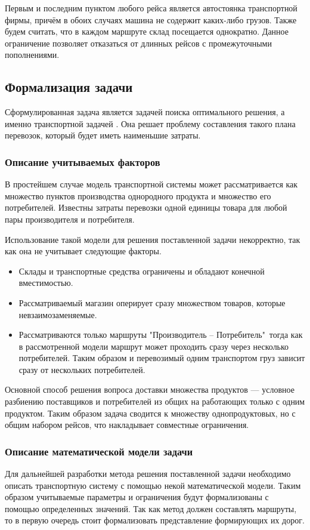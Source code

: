	Первым и последним пунктом любого рейса является автостоянка транспортной фирмы, причём в обоих случаях машина не содержит каких-либо грузов. Также будем считать, что в каждом маршруте склад посещается однократно. Данное ограничение позволяет отказаться от длинных рейсов с промежуточными пополнениями.

\subsection{Формализация задачи}
	Сформулированная задача является задачей поиска оптимального решения, а именно транспортной задачей \cite{trans:main}. Она решает проблему составления такого плана перевозок, который будет иметь наименьшие затраты. 
	
	\subsubsection{Описание учитываемых факторов}
	В простейшем случае модель транспортной системы может рассматривается как множество пунктов производства однородного продукта и множество его потребителей. Известны затраты перевозки одной единицы товара для любой пары производителя и потребителя.
	
	Использование такой модели для решения поставленной задачи некорректно, так как она не учитывает следующие факторы.
	\begin{itemize}
		\item Склады и транспортные средства ограничены и обладают конечной вместимостью.
		\item Рассматриваемый магазин оперирует сразу множеством товаров, которые невзаимозаменяемые.
		\item Рассматриваются только маршруты "Производитель -- Потребитель"\, тогда как в рассмотренной модели маршрут может проходить сразу через несколько потребителей. Таким образом и перевозимый одним транспортом груз зависит сразу от нескольких потребителей.
	\end{itemize}
		
	Основной способ решения вопроса доставки множества продуктов --- условное разбиению поставщиков и потребителей из общих на работающих только с одним продуктом. Таким образом задача сводится к множеству однопродуктовых, но с общим набором рейсов, что накладывает совместные ограничения.
	
	\subsubsection{Описание математической модели задачи}
	Для дальнейшей разработки метода решения поставленной задачи необходимо описать транспортную систему с помощью некой математической модели. Таким образом учитываемые параметры и ограничения будут формализованы с помощью определенных значений. Так как метод должен составлять маршруты, то в первую очередь стоит формализовать представление формирующих их дорог. 
	
